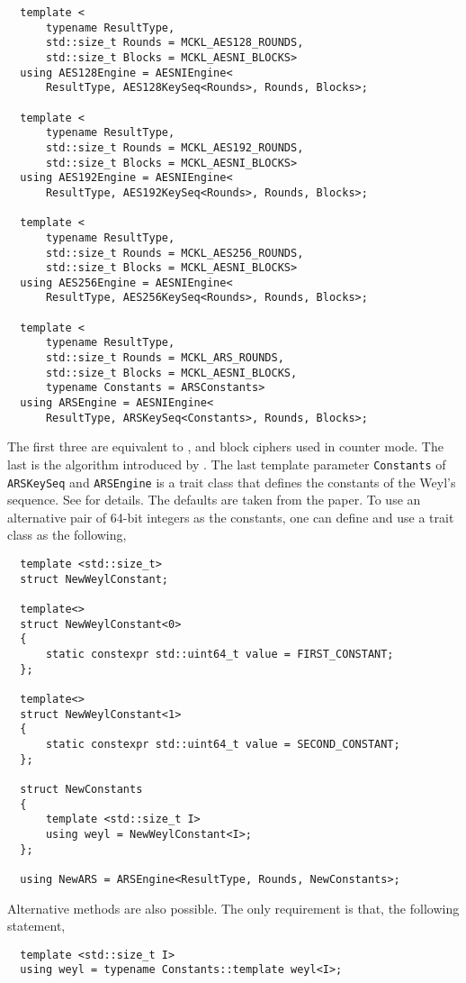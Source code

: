 \begin{Verbatim}
  template <
      typename ResultType,
      std::size_t Rounds = MCKL_AES128_ROUNDS,
      std::size_t Blocks = MCKL_AESNI_BLOCKS>
  using AES128Engine = AESNIEngine<
      ResultType, AES128KeySeq<Rounds>, Rounds, Blocks>;

  template <
      typename ResultType,
      std::size_t Rounds = MCKL_AES192_ROUNDS,
      std::size_t Blocks = MCKL_AESNI_BLOCKS>
  using AES192Engine = AESNIEngine<
      ResultType, AES192KeySeq<Rounds>, Rounds, Blocks>;

  template <
      typename ResultType,
      std::size_t Rounds = MCKL_AES256_ROUNDS,
      std::size_t Blocks = MCKL_AESNI_BLOCKS>
  using AES256Engine = AESNIEngine<
      ResultType, AES256KeySeq<Rounds>, Rounds, Blocks>;

  template <
      typename ResultType,
      std::size_t Rounds = MCKL_ARS_ROUNDS,
      std::size_t Blocks = MCKL_AESNI_BLOCKS,
      typename Constants = ARSConstants>
  using ARSEngine = AESNIEngine<
      ResultType, ARSKeySeq<Constants>, Rounds, Blocks>;
\end{Verbatim}
The first three are equivalent to ,  and  block ciphers
used in counter mode. The last is the \ars algorithm introduced by
\textcite{Salmon:2011um}. The last template parameter \verb|Constants| of
\verb|ARSKeySeq| and \verb|ARSEngine| is a trait class that defines the
constants of the Weyl's sequence. See \textcite{Salmon:2011um} for details. The
defaults are taken from the paper. To use an alternative pair of 64-bit
integers as the constants, one can define and use a trait class as the
following,
\begin{Verbatim}
  template <std::size_t>
  struct NewWeylConstant;

  template<>
  struct NewWeylConstant<0>
  {
      static constexpr std::uint64_t value = FIRST_CONSTANT;
  };

  template<>
  struct NewWeylConstant<1>
  {
      static constexpr std::uint64_t value = SECOND_CONSTANT;
  };

  struct NewConstants
  {
      template <std::size_t I>
      using weyl = NewWeylConstant<I>;
  };

  using NewARS = ARSEngine<ResultType, Rounds, NewConstants>;
\end{Verbatim}
Alternative methods are also possible. The only requirement is that, the
following statement,
\begin{Verbatim}
  template <std::size_t I>
  using weyl = typename Constants::template weyl<I>;
\end{Verbatim}
